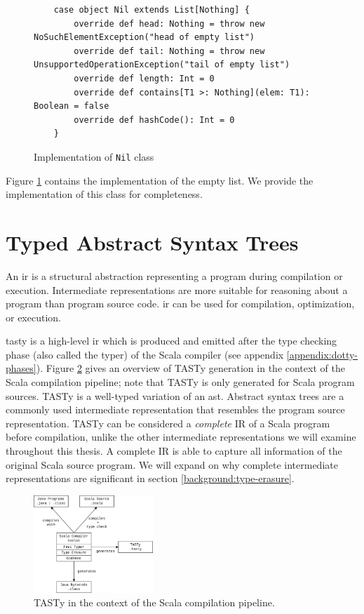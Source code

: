 \begin{figure}[!htb]
	\begin{verbatim}
	case object Nil extends List[Nothing] {
		override def head: Nothing = throw new NoSuchElementException("head of empty list")
		override def tail: Nothing = throw new UnsupportedOperationException("tail of empty list")
		override def length: Int = 0
		override def contains[T1 >: Nothing](elem: T1): Boolean = false
		override def hashCode(): Int = 0
	}
	\end{verbatim}
	\caption{Implementation of \texttt{Nil} class}
	\label{example:nil-impl}
\end{figure}

Figure \ref{example:nil-impl} contains the implementation of the empty list. 
We provide the implementation of this class for completeness.

\section{Typed Abstract Syntax Trees}

An \acrfull{ir} is a structural abstraction representing a program during compilation or execution. 
Intermediate representations are more suitable for reasoning about a program than program source code. 
\acrshort{ir} can be used for compilation\cite{llvm}, optimization\cite{llvm,ssa}, or execution\cite{java:vm-spec,clr:spec}.

\acrfull{tasty} is a high-level \acrfull{ir} which is produced and emitted after the type checking phase (also called the typer) of the Scala compiler (see appendix \ref{appendix:dotty-phases}).
Figure \ref{system:tasty} gives an overview of TASTy generation in the context of the Scala compilation pipeline; note that TASTy is only generated for Scala program sources.
TASTy is a well-typed variation of an \acrfull{ast}.
Abstract syntax trees are a commonly used intermediate representation that resembles the program source representation.
TASTy can be considered a \textit{complete} IR of a Scala program before compilation, unlike the other intermediate representations we will examine throughout this thesis.
A complete IR is able to capture all information of the original Scala source program.
We will expand on why complete intermediate representations are significant in section \ref{background:type-erasure}.

\begin{figure}[H]
	\centering
	\includegraphics[width=0.4\textwidth]{figures/scala-pipeline.png}
	\caption{TASTy in the context of the Scala compilation pipeline.}
	\label{system:tasty}
\end{figure}

